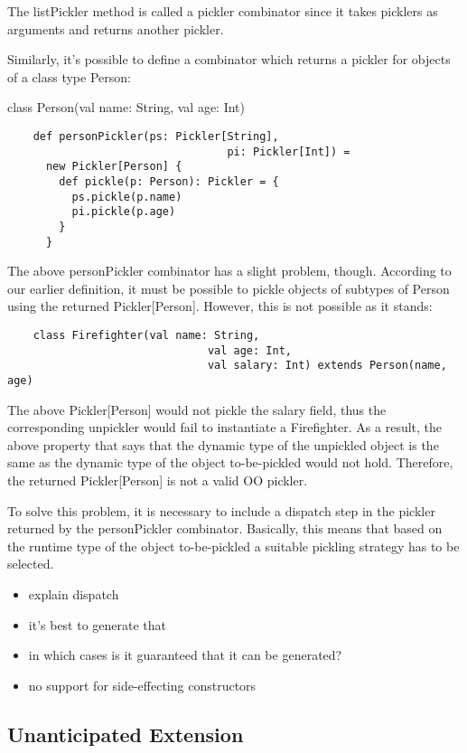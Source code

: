 \documentclass[preprint,10pt]{sigplanconf}
\begin{document}
The listPickler method is called a pickler combinator since it takes picklers as arguments and returns another pickler.

Similarly, it's possible to define a combinator which returns a pickler for objects of a class type Person:

    class Person(val name: String, val age: Int)

\begin{verbatim}
    def personPickler(ps: Pickler[String],
                                  pi: Pickler[Int]) =
      new Pickler[Person] {
        def pickle(p: Person): Pickler = {
          ps.pickle(p.name)
          pi.pickle(p.age)
        }
      }
\end{verbatim}

The above personPickler combinator has a slight problem, though. According to our earlier definition, it must be possible to pickle objects of subtypes of Person using the returned Pickler[Person]. However, this is not possible as it stands:

\begin{verbatim}
    class Firefighter(val name: String,
                               val age: Int,
                               val salary: Int) extends Person(name, age)
\end{verbatim}

The above Pickler[Person] would not pickle the salary field, thus the corresponding unpickler would fail to instantiate a Firefighter. As a result, the above property that says that the dynamic type of the unpickled object is the same as the dynamic type of the object to-be-pickled would not hold. Therefore, the returned Pickler[Person] is not a valid OO pickler.

To solve this problem, it is necessary to include a dispatch step in the pickler returned by the personPickler combinator. Basically, this means that based on the runtime type of the object to-be-pickled a suitable pickling strategy has to be selected.

\begin{itemize}
  \item explain dispatch
  \item it's best to generate that
  \item in which cases is it guaranteed that it can be generated?
    \item no support for side-effecting constructors
\end{itemize}

\subsection{Unanticipated Extension}
\end{document}
